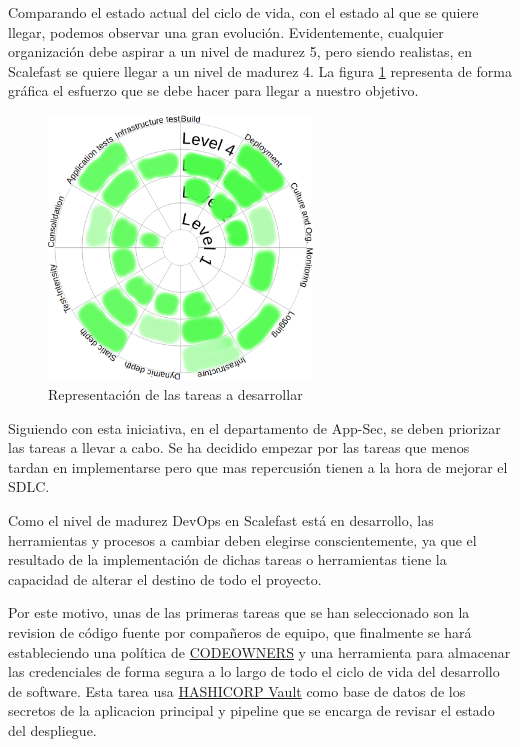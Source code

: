 \documentclass[12pt]{report} %
\begin{document}
Comparando el estado actual del ciclo de vida, con el estado al que se quiere
llegar, podemos observar una gran evolución.
Evidentemente, cualquier organización debe aspirar a un nivel de madurez 5, pero
siendo realistas, en Scalefast se quiere llegar a un nivel de madurez 4.
La figura \ref{fig:DSOMM-TODO} representa de forma gráfica el esfuerzo que se
debe hacer para llegar a nuestro objetivo.

\begin{figure}
  \includegraphics[width=7cm]{DSOMM-TODO}
  \caption{Representación de las tareas a desarrollar}
  \label{fig:DSOMM-TODO}
\end{figure}

Siguiendo con esta iniciativa, en el departamento de \gls{App-Sec}, se deben
priorizar las tareas a llevar a cabo.
Se ha decidido empezar por las tareas que menos tardan en implementarse pero que
mas repercusión tienen a la hora de mejorar el \gls{SDLC}.

Como el nivel de madurez \gls{DevOps} en Scalefast está en desarrollo, las
herramientas y procesos a cambiar deben elegirse conscientemente, ya que el
resultado de la implementación de dichas tareas o herramientas tiene la
capacidad de alterar el destino de todo el proyecto.

Por este motivo, unas de las primeras tareas que se han seleccionado son la
revision de código fuente por compañeros de equipo, que finalmente se hará
estableciendo una política de 
\href{https://docs.gitlab.com/ee/user/project/code_owners.html}{CODEOWNERS} y
una herramienta para almacenar las credenciales de forma segura a lo largo de
todo el ciclo de vida del desarrollo de software.
Esta tarea usa \href{https://www.hashicorp.com/products/vault}{HASHICORP Vault}
como base de datos de los secretos de la aplicacion principal y pipeline que se
encarga de revisar el estado del despliegue.
\end{document}
